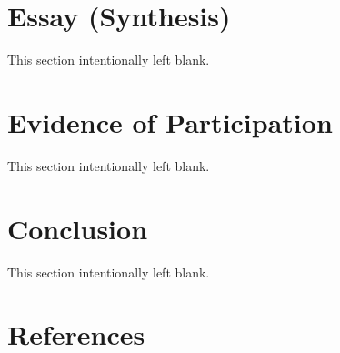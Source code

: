 \documentclass[11pt]{article}
\begin{document}
\section{Essay (Synthesis)}
This section intentionally left blank.

\section{Evidence of Participation}
This section intentionally left blank.

\section{Conclusion}
This section intentionally left blank.

\section*{References}
\end{document}
